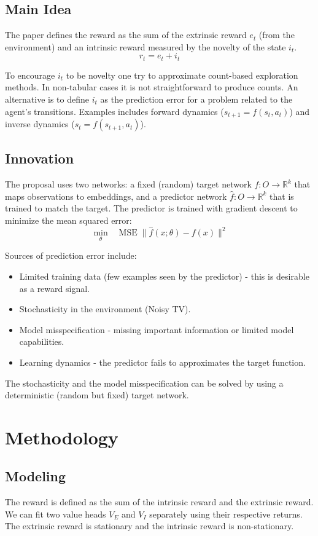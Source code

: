 \documentclass[11pt,a4paper]{article}
\begin{document}
\subsection{Main Idea}
The paper defines the reward as the sum of the extrinsic reward $e_t$ (from the environment) and an intrinsic reward measured by the
novelty of the state $i_t$.
\[
r_t = e_t + i_t
\]

To encourage $i_t$ to be novelty one try to approximate count-based exploration methods. 
In non-tabular cases it is not straightforward to produce counts. An alternative is to define $i_t$ as the prediction error for a problem related to the agent's
transitions. Examples includes forward dynamics ($s_{t+1} = f(s_t, a_t)$) and inverse dynamics ($s_t = f(s_{t+1}, a_t)$). 

\subsection{Innovation}
The proposal uses two networks: a fixed (random) target network $f: O \rightarrow \mathbb{R}^k$ that maps observations to embeddings, 
and a predictor network $\hat{f}: O \xrightarrow{} \mathbb{R}^k$ that is trained to match the target. The predictor is trained with gradient descent to minimize the mean squared error:
\[
\min_\theta \quad \text{MSE} \; \| \hat{f}(x; \theta) - f(x) \|^2
\]

Sources of prediction error include: 
\begin{itemize}
    \item Limited training data (few examples seen by the predictor) - this is desirable as a reward signal.
    \item Stochasticity in the environment (Noisy TV).
    \item Model misspecification - missing important information or limited model capabilities. 
    \item Learning dynamics - the predictor fails to approximates the target function.
\end{itemize}
The stochasticity and the model misspecification can be solved by using a deterministic (random but fixed) target network. 


\section{Methodology}

\subsection{Modeling} 
The reward is defined as the sum of the intrinsic reward and the extrinsic reward. We can fit two value heads 
$V_E$ and $V_I$ separately using their respective returns. The extrinsic reward is stationary and the intrinsic reward is non-stationary.
\end{document}
